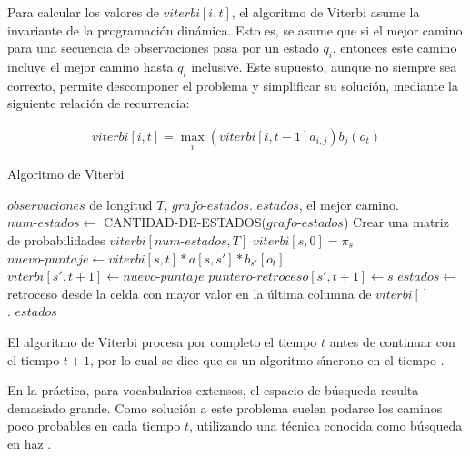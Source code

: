 Para calcular los valores de $viterbi[i,t]$, el algoritmo de Viterbi asume la invariante de la 
programaci\'on din\'amica. Esto es, se asume que si el mejor camino para una secuencia de observaciones 
pasa por un estado $q_i$, entonces este camino incluye el mejor camino hasta $q_i$ inclusive. 
Este supuesto, aunque no siempre sea correcto, permite descomponer el problema y simplificar su soluci\'on,
mediante la siguiente relaci\'on de recurrencia:

\begin{align}
	viterbi[i,t] = \displaystyle \max_i (viterbi[i,t-1]a_{i,j})b_j(o_t)
\end{align}

\begin{algorithm}[H]
\caption{Algoritmo de Viterbi} \label{viterbi}
\begin{algorithmic}[1]
\REQUIRE $observaciones$ de longitud $T$, $grafo\mbox{-}estados$.
\ENSURE $estados$, el mejor camino.
\STATE $num\mbox{-}estados \leftarrow$ CANTIDAD-DE-ESTADOS($grafo\mbox{-}estados$) 
\STATE Crear una matriz de probabilidades $viterbi[num\mbox{-}estados, T]$
	\STATE $viterbi[s,0] = \pi_s$
\ENDFOR
{}
		\STATE $nuevo\mbox{-}puntaje \leftarrow viterbi[s,t] * a[s,s'] * b_{s'}[o_t]$
			\STATE $viterbi[s',t+1] \leftarrow nuevo\mbox{-}puntaje$
			\STATE $puntero\mbox{-}retroceso[s',t+1] \leftarrow s$
		\ENDIF  
		\ENDFOR
	\ENDFOR
\ENDFOR
\STATE $estados \leftarrow$ retroceso desde la celda con mayor valor en la \'ultima columna de $viterbi[]$
\\ .
\RETURN $estados$
\end{algorithmic}
\end{algorithm}

El algoritmo de Viterbi procesa por completo el tiempo $t$ antes de continuar con el tiempo $t + 1$, por
lo cual se dice que es un algoritmo s{\'\i}ncrono en el tiempo \cite{huang-handbook10}.

En la pr\'actica, para vocabularios extensos, el espacio de b\'usqueda resulta demasiado grande.
Como soluci\'on a este problema suelen podarse los caminos poco probables en cada tiempo $t$,
utilizando una t\'ecnica conocida como b\'usqueda en haz \cite{Jurafsky}.

